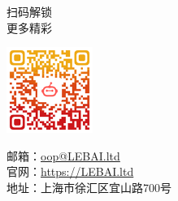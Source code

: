 
\centering



扫码解锁\\
更多精彩
 
\vfill

\includegraphics[width=2.8cm]{image/qrcode.png}

\vfill

邮箱：\url{oop@LEBAI.ltd}\\
官网：\url{https://LEBAI.ltd}\\
地址：上海市徐汇区宜山路700号

